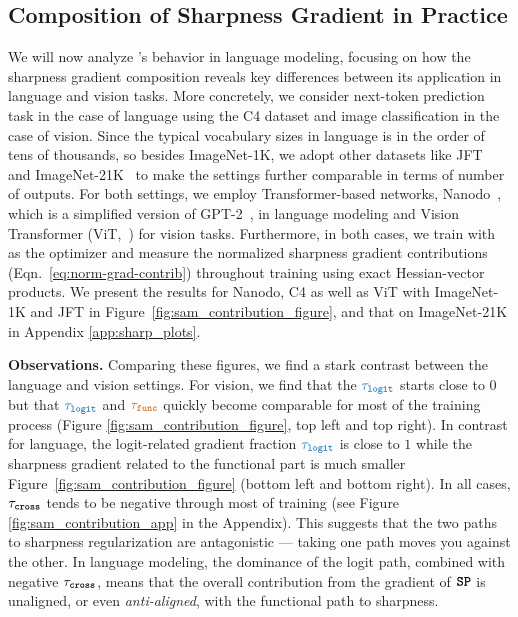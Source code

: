 \subsection{Composition of Sharpness Gradient in Practice}
We will now analyze \SAM's behavior in language modeling, focusing on how the sharpness gradient composition reveals key differences between its application in language and vision tasks. More concretely, we consider next-token prediction task in the case of language using the C4 dataset and image classification in the case of vision. Since the typical vocabulary sizes in language is in the order of tens of thousands, so besides ImageNet-1K, we adopt other datasets like  JFT~\citep{sun2017revisitingunreasonableeffectivenessdata} and ImageNet-21K~\citep{ridnik2021imagenet21kpretrainingmasses} to make the settings further comparable in terms of number of outputs. For both settings, we employ Transformer-based networks, Nanodo~\citep{nanodo}, which is a simplified version of GPT-2~\citep{radford2019language}, in language modeling and Vision Transformer (ViT,~\citealp{dosovitskiy2021imageworth16x16words}) for vision tasks. Furthermore, in both cases, we train with \adamw as the optimizer and measure the normalized sharpness gradient contributions (Eqn.~\ref{eq:norm-grad-contrib}) throughout training using exact Hessian-vector products. We present the results for Nanodo, C4 as well as ViT with ImageNet-1K and JFT in Figure~\ref{fig:sam_contribution_figure}, and that on ImageNet-21K in Appendix \ref{app:sharp_plots}.

\textbf{Observations.} Comparing these figures, we find a stark contrast between the language and vision settings.
For vision, we find that the $\lcolor{\tlog}$ starts close to $0$
but that $\lcolor{\tlog}$ and $\fcolor{\tfn}$ quickly become comparable for most of the training process 
(Figure \ref{fig:sam_contribution_figure}, top left and top right).
In contrast for language, the logit-related gradient fraction $\lcolor{\tlog}$ is close to $1$ while the sharpness gradient related to the functional part is much smaller 
Figure~\ref{fig:sam_contribution_figure} (bottom left and bottom right). 
In all cases, $\tau_{\textbf{\texttt{cross}}}$ tends to be negative through most of training (see Figure \ref{fig:sam_contribution_app} in the Appendix).
This suggests that the two paths to sharpness regularization are antagonistic --- taking one path moves you against the other.
In language modeling, the dominance of the logit path, combined with negative $\tau_{\textbf{\texttt{cross}}}$, means that the overall
contribution from the gradient of $\textcolor{black}{\textbf{\texttt{SP}}}$ is unaligned, or even \emph{anti-aligned}, with the functional path to
sharpness.








